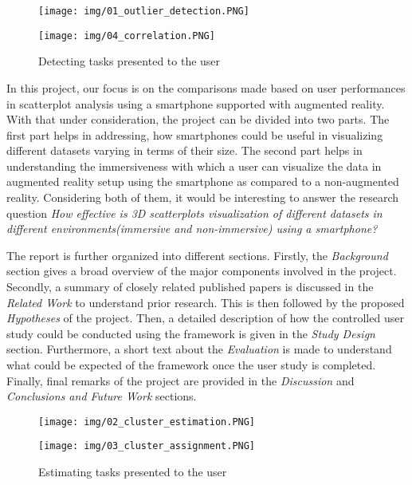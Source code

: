 \documentclass[journal]{vgtc}                %
\begin{document}
\begin{figure}[ht]
    \begin{minipage}[b]{0.45\linewidth}
        \centering
        \texttt{[image: img/01\_outlier\_detection.PNG]}
    \end{minipage}
    \hspace{0.5cm}
    \begin{minipage}[b]{0.45\linewidth}
        \centering
        \texttt{[image: img/04\_correlation.PNG]}
    \end{minipage}
    \caption{Detecting tasks presented to the user}
\end{figure}

In this project, our focus is on the comparisons made based on user performances in scatterplot analysis using a smartphone supported with augmented reality. With that under consideration, the project can be divided into two parts. The first part helps in addressing, how smartphones could be useful in visualizing different datasets varying in terms of their size. The second part helps in understanding the immersiveness with which a user can visualize the data in augmented reality setup using the smartphone as compared to a non-augmented reality. Considering both of them, it would be interesting to answer the research question \textit{How effective is 3D scatterplots visualization of different datasets in different environments(immersive and non-immersive) using a smartphone?}\cite{cliquet2017towards}\cite{lu2016towards}

The report is further organized into different sections. Firstly, the \textit{Background} section gives a broad overview of the major components involved in the project.  Secondly, a summary of closely related published papers is discussed in the \textit{Related Work} to understand prior research. This is then followed by the proposed \textit{Hypotheses} of the project. Then, a detailed description of how the controlled user study could be conducted using the framework is given in the \textit{Study Design} section. Furthermore, a short text about the \textit{Evaluation} is made to understand what could be expected of the framework once the user study is completed. Finally, final remarks of the project are provided in the \textit{Discussion} and \textit{Conclusions and Future Work} sections.


\begin{figure}[ht]
    \begin{minipage}[b]{0.45\linewidth}
        \centering
        \texttt{[image: img/02\_cluster\_estimation.PNG]}
    \end{minipage}
    \hspace{0.5cm}
    \begin{minipage}[b]{0.45\linewidth}
        \centering
        \texttt{[image: img/03\_cluster\_assignment.PNG]}
    \end{minipage}
    \caption{Estimating tasks presented to the user}
\end{figure}
\end{document}
